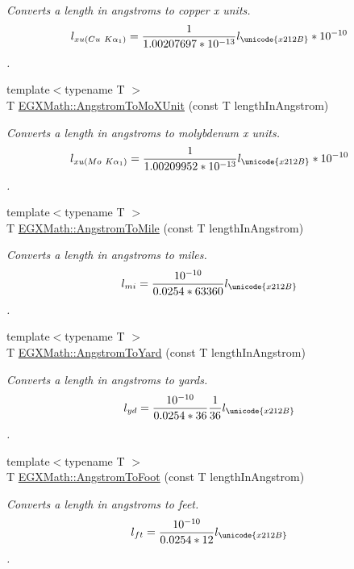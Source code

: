 \begin{DoxyCompactItemize}
\begin{DoxyCompactList}\small\item\em Converts a length in angstroms to copper x units. \[ l_{xu(Cu\ K\alpha_1)}= \frac{1}{1.00207697*10^{-13}} l_{\unicode{x212B}} * 10^{-10}\]. \end{DoxyCompactList}\item 
{\footnotesize template$<$typename T $>$ }\\T \mbox{\hyperlink{group___e_g_x_math-_conversions-_length_conversions-_non-_s_i-_angstrom-_non-_s_i_ga197c8294d73fcc3171cd05fc595816c4}{E\+G\+X\+Math\+::\+Angstrom\+To\+Mo\+X\+Unit}} (const T length\+In\+Angstrom)
\begin{DoxyCompactList}\small\item\em Converts a length in angstroms to molybdenum x units. \[ l_{xu(Mo\ K\alpha_1)}=\frac{1}{1.00209952*10^{-13}} l_{\unicode{x212B}} * 10^{-10}\]. \end{DoxyCompactList}\item 
{\footnotesize template$<$typename T $>$ }\\T \mbox{\hyperlink{group___e_g_x_math-_conversions-_length_conversions-_non-_s_i-_angstrom-_imperial_ga184d0b1ccefcc2e210a8a42530573bac}{E\+G\+X\+Math\+::\+Angstrom\+To\+Mile}} (const T length\+In\+Angstrom)
\begin{DoxyCompactList}\small\item\em Converts a length in angstroms to miles. \[ l_{mi}=\frac{10^{-10}}{0.0254 * 63360} l_{\unicode{x212B}} \]. \end{DoxyCompactList}\item 
{\footnotesize template$<$typename T $>$ }\\T \mbox{\hyperlink{group___e_g_x_math-_conversions-_length_conversions-_non-_s_i-_angstrom-_imperial_ga57cb8a4219a83a504bf2ea1e7d250144}{E\+G\+X\+Math\+::\+Angstrom\+To\+Yard}} (const T length\+In\+Angstrom)
\begin{DoxyCompactList}\small\item\em Converts a length in angstroms to yards. \[ l_{yd}= \frac{10^{-10}}{0.0254 * 36} \frac{1}{36} l_{\unicode{x212B}} \]. \end{DoxyCompactList}\item 
{\footnotesize template$<$typename T $>$ }\\T \mbox{\hyperlink{group___e_g_x_math-_conversions-_length_conversions-_non-_s_i-_angstrom-_imperial_ga54cf539cd2acf7065ed22fb4a846d933}{E\+G\+X\+Math\+::\+Angstrom\+To\+Foot}} (const T length\+In\+Angstrom)
\begin{DoxyCompactList}\small\item\em Converts a length in angstroms to feet. \[ l_{ft}= \frac{10^{-10}}{0.0254 * 12} l_{\unicode{x212B}} \]. \end{DoxyCompactList}\item 

\end{DoxyCompactItemize}
